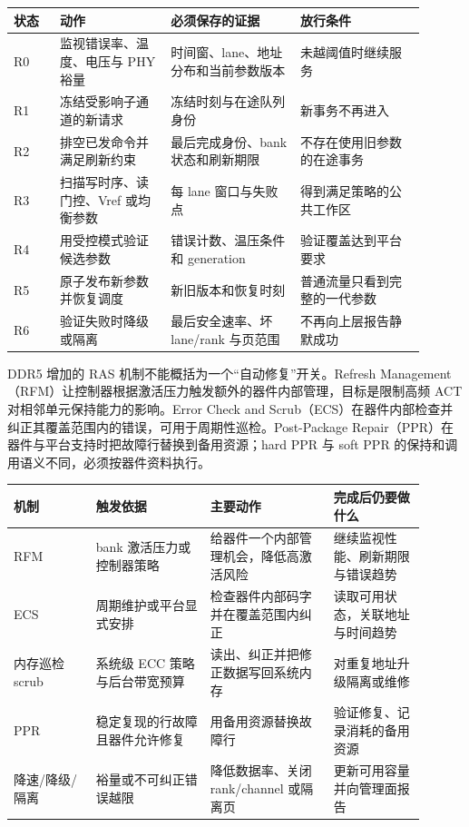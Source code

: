 \begin{longtable}{L{0.10\linewidth}L{0.24\linewidth}L{0.29\linewidth}L{0.27\linewidth}}
\toprule
状态 & 动作 & 必须保存的证据 & 放行条件 \\
\midrule
R0 & 监视错误率、温度、电压与 PHY 裕量 & 时间窗、lane、地址分布和当前参数版本 & 未越阈值时继续服务 \\\tablerowrule
R1 & 冻结受影响子通道的新请求 & 冻结时刻与在途队列身份 & 新事务不再进入 \\\tablerowrule
R2 & 排空已发命令并满足刷新约束 & 最后完成身份、bank 状态和刷新期限 & 不存在使用旧参数的在途事务 \\\tablerowrule
R3 & 扫描写时序、读门控、Vref 或均衡参数 & 每 lane 窗口与失败点 & 得到满足策略的公共工作区 \\\tablerowrule
R4 & 用受控模式验证候选参数 & 错误计数、温压条件和 generation & 验证覆盖达到平台要求 \\\tablerowrule
R5 & 原子发布新参数并恢复调度 & 新旧版本和恢复时刻 & 普通流量只看到完整的一代参数 \\\tablerowrule
R6 & 验证失败时降级或隔离 & 最后安全速率、坏 lane/rank 与页范围 & 不再向上层报告静默成功 \\
\bottomrule
\end{longtable}


DDR5 增加的 RAS 机制不能概括为一个“自动修复”开关。Refresh Management（RFM）让控制器根据激活压力触发额外的器件内部管理，目标是限制高频 ACT 对相邻单元保持能力的影响。Error Check and Scrub（ECS）在器件内部检查并纠正其覆盖范围内的错误，可用于周期性巡检。Post-Package Repair（PPR）在器件与平台支持时把故障行替换到备用资源；hard PPR 与 soft PPR 的保持和调用语义不同，必须按器件资料执行。\cite{micron-ddr5}

\begin{longtable}{L{0.18\linewidth}L{0.25\linewidth}L{0.27\linewidth}L{0.20\linewidth}}
\toprule
机制 & 触发依据 & 主要动作 & 完成后仍要做什么 \\
\midrule
RFM & bank 激活压力或控制器策略 & 给器件一个内部管理机会，降低高激活风险 & 继续监视性能、刷新期限与错误趋势 \\\tablerowrule
ECS & 周期维护或平台显式安排 & 检查器件内部码字并在覆盖范围内纠正 & 读取可用状态，关联地址与时间趋势 \\\tablerowrule
内存巡检 scrub & 系统级 ECC 策略与后台带宽预算 & 读出、纠正并把修正数据写回系统内存 & 对重复地址升级隔离或维修 \\\tablerowrule
PPR & 稳定复现的行故障且器件允许修复 & 用备用资源替换故障行 & 验证修复、记录消耗的备用资源 \\\tablerowrule
降速/降级/隔离 & 裕量或不可纠正错误越限 & 降低数据率、关闭 rank/channel 或隔离页 & 更新可用容量并向管理面报告 \\
\bottomrule
\end{longtable}


